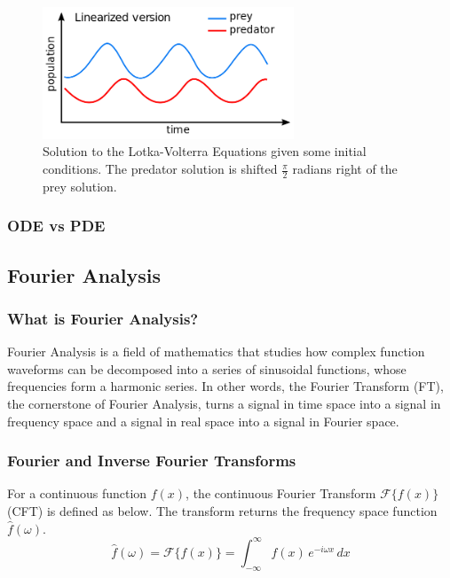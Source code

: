 \begin{figure}[H]
    \centering
    \includegraphics[width=75mm,height=\textheight,keepaspectratio]{images/Lotka_Volterra_dynamics.png}
    \caption{Solution to the Lotka-Volterra Equations given some initial conditions. The predator solution is shifted $\frac{\pi}{2}$ radians right of the prey solution.}
    \label{fig:lotka_volterra_init}
\end{figure}

\subsubsection{ODE vs PDE}

\subsection{Fourier Analysis}
\subsubsection{What is Fourier Analysis?}
Fourier Analysis is a field of mathematics that studies how complex function waveforms can be decomposed into a series of sinusoidal functions, whose frequencies form a harmonic series. In other words, the Fourier Transform (FT), the cornerstone of Fourier Analysis, turns a signal in time space into a signal in frequency space and a signal in real space into a signal in Fourier space.

\subsubsection{Fourier and Inverse Fourier Transforms}
\begin{definition}
    For a continuous function $f(x)$, the continuous Fourier Transform $\mathcal{F}\{ f(x) \}$ (CFT) is defined as below. The transform returns the frequency space function $\hat{f}(\omega)$.
    \begin{equation}
        \hat{f}(\omega) = \mathcal{F}\{ f(x) \} = \int_{-\infty}^{\infty} f(x)  \, e^{-i \omega x} \,dx
    \end{equation}
\end{definition}

